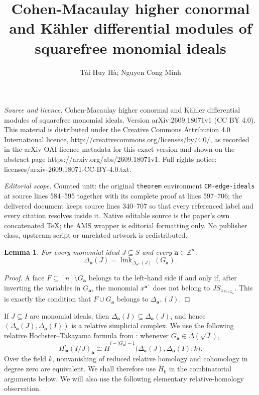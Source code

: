 \documentclass[10pt,a4paper]{amsart}
\newtheorem{lemma}[theorem]{Lemma}
\begin{document}
\title[Cohen-Macaulay higher conormal and K"ahler differential modu]{Cohen-Macaulay higher conormal and K\"ahler differential modules of squarefree monomial ideals}
\author{T\`ai Huy H\`a; Nguyen Cong Minh}
\date{}
\maketitle
\noindent\emph{Source and licence.} Cohen-Macaulay higher conormal and K\"ahler differential modules of squarefree monomial ideals. Version arXiv:2609.18071v1 (CC BY 4.0). This material is distributed under the Creative Commons Attribution 4.0 International licence, http://creativecommons.org/licenses/by/4.0/, as recorded in the arXiv OAI licence metadata for this exact version and shown on the abstract page https://arxiv.org/abs/2609.18071v1. Full rights notice: licenses/arxiv-2609.18071-CC-BY-4.0.txt.\par\smallskip
\noindent\textit{Editorial scope.} Counted unit: the original \texttt{theorem} environment \texttt{CM-edge-ideals} at source lines 584--595 together with its complete proof at lines 597--706; the delivered document keeps source lines 340--707 so that every referenced label and every citation resolves inside it. Native editable source is the paper's own concatenated TeX; the AMS wrapper is editorial formatting only. No publisher class, upstream script or unrelated artwork is redistributed.
\begin{lemma}\label{lem:negative-link}
For every monomial ideal $J\subseteq S$ and every $\mathbf a\in\mathbb Z^n$,
$$
\Delta_{\mathbf a}(J)
=
\operatorname{link}_{\Delta_{\mathbf a^+}(J)}(G_{\mathbf a}).
$$
\end{lemma}

\begin{proof}
A face $F\subseteq[n]\setminus G_{\mathbf a}$ belongs to the left-hand side
if and only if, after inverting the variables in $G_{\mathbf a}$, the monomial
$x^{\mathbf a^+}$ does not belong to $J S_{x_{F\cup G_{\mathbf a}}}$. This is
exactly the condition that $F\cup G_{\mathbf a}$ belongs to
$\Delta_{\mathbf a^+}(J)$.
\end{proof}

If $J\subseteq I$ are monomial ideals, then
$\Delta_{\mathbf a}(I)\subseteq\Delta_{\mathbf a}(J)$, and hence
$(\Delta_{\mathbf a}(J),\Delta_{\mathbf a}(I))$ is a relative simplicial
complex. We use the following relative Hochster--Takayama formula from
\cite[Theorem~3.2]{HaMinh}: whenever
$G_{\mathbf a}\in\Delta(\sqrt J)$,
$$
H^i_{\mathfrak m}(I/J)_{\mathbf a}
\cong
\widetilde H^{i-|G_{\mathbf a}|-1}
\bigl(\Delta_{\mathbf a}(J),\Delta_{\mathbf a}(I);k\bigr).
$$
Over the field $k$, nonvanishing of reduced relative homology and cohomology in
degree zero are equivalent. We shall therefore use $\widetilde H_0$ in the
combinatorial arguments below. We will also use the following elementary
relative-homology observation.
\end{document}
